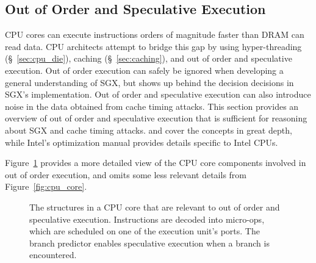 \subsection{Out of Order and Speculative Execution}
\label{sec:out_of_order}

CPU cores can execute instructions orders of magnitude faster than DRAM can
read data. CPU architects attempt to bridge this gap by using hyper-threading
(\S~\ref{sec:cpu_die}), caching (\S~\ref{sec:caching}), and out of order and
speculative execution. Out of order execution can safely be ignored when
developing a general understanding of SGX, but shows up behind the decision
decisions in SGX's implementation. Out of order and speculative execution can
also introduce noise in the data obtained from cache timing attacks. This
section provides an overview of out of order and speculative execution that is
sufficient for reasoning about SGX and cache timing attacks.
\cite{patterson2013architecture} and \cite{hennessy2012architecture} cover the
concepts in great depth, while Intel's optimization manual
\cite{intel2014optimization} provides details specific to Intel CPUs.


Figure~\ref{fig:cpu_out_of_order} provides a more detailed view of the CPU core
components involved in out of order execution, and omits some less relevant
details from Figure~\ref{fig:cpu_core}.

\begin{figure}[hbt]
  \caption{
    The structures in a CPU core that are relevant to out of order and
    speculative execution. Instructions are decoded into micro-ops, which are
    scheduled on one of the execution unit's ports. The branch predictor
    enables speculative execution when a branch is encountered.
  }
  \label{fig:cpu_out_of_order}
\end{figure}

